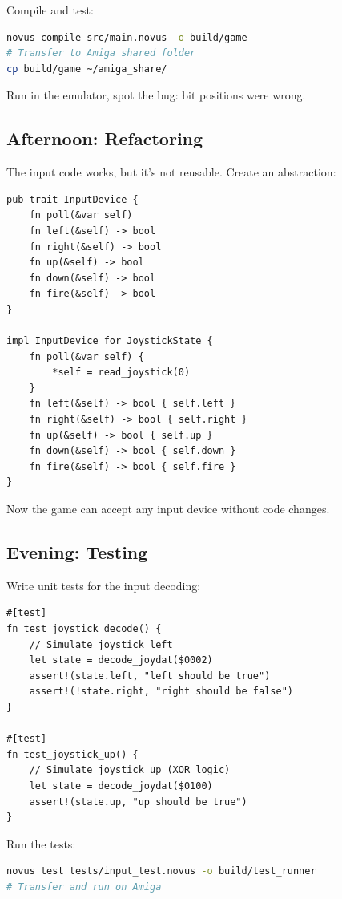 Compile and test:

\begin{lstlisting}[language=bash]
novus compile src/main.novus -o build/game
# Transfer to Amiga shared folder
cp build/game ~/amiga_share/
\end{lstlisting}

Run in the emulator, spot the bug: bit positions were wrong.

\subsection{Afternoon: Refactoring}

The input code works, but it's not reusable. Create an abstraction:

\begin{lstlisting}
pub trait InputDevice {
    fn poll(&var self)
    fn left(&self) -> bool
    fn right(&self) -> bool
    fn up(&self) -> bool
    fn down(&self) -> bool
    fn fire(&self) -> bool
}

impl InputDevice for JoystickState {
    fn poll(&var self) {
        *self = read_joystick(0)
    }
    fn left(&self) -> bool { self.left }
    fn right(&self) -> bool { self.right }
    fn up(&self) -> bool { self.up }
    fn down(&self) -> bool { self.down }
    fn fire(&self) -> bool { self.fire }
}
\end{lstlisting}

Now the game can accept any input device without code changes.

\subsection{Evening: Testing}

Write unit tests for the input decoding:

\begin{lstlisting}
#[test]
fn test_joystick_decode() {
    // Simulate joystick left
    let state = decode_joydat($0002)
    assert!(state.left, "left should be true")
    assert!(!state.right, "right should be false")
}

#[test]
fn test_joystick_up() {
    // Simulate joystick up (XOR logic)
    let state = decode_joydat($0100)
    assert!(state.up, "up should be true")
}
\end{lstlisting}

Run the tests:

\begin{lstlisting}[language=bash]
novus test tests/input_test.novus -o build/test_runner
# Transfer and run on Amiga
\end{lstlisting}

